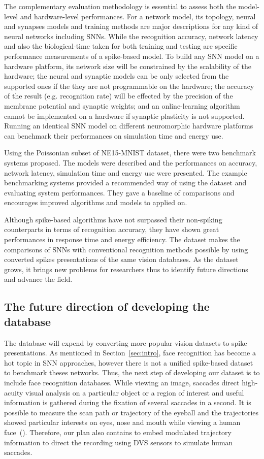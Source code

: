 The complementary evaluation methodology is essential to assess both the model-level and hardware-level performances.
For a network model, its topology, neural and synapses models and training methods are major descriptions for any kind of neural networks including SNNs.
While the recognition accuracy, network latency and also the biological-time taken for both training and testing are specific performance measurements of a spike-based model.
To build any SNN model on a hardware platform, its network size will be constrained by the scalability of the hardware;
the neural and synaptic models can be only selected from the supported ones if the they are not programmable on the hardware;
the accuracy of the result (e.g. recognition rate) will be effected by the precision of the membrane potential and synaptic weights;
and an online-learning algorithm cannot be implemented on a hardware if synaptic plasticity is not supported.
Running an identical SNN model on  different neuromorphic hardware platforms can benchmark their performances on simulation time and energy use.


Using the Poissonian subset of NE15-MNIST dataset, there were two benchmark systems proposed. 
The models were described and the performances on accuracy, network latency, simulation time and energy use were presented.
The example benchmarking systems provided a recommended way of using the dataset and evaluating system performances.
They gave a baseline of comparisons and encourages improved algorithms and models to applied on. 

Although spike-based algorithms have not surpassed their non-spiking counterparts in terms of recognition accuracy, they have shown great performances in response time and energy efficiency.
The dataset makes the comparisons of SNNs with conventional recognition methods possible by using converted spikes presentations of the same vision databases.
As the dataset grows, it brings new problems for researchers thus to identify future directions and advance the field.
\subsection{The future direction of developing the database}
The database will expend by converting more popular vision datasets to spike presentations.
As mentioned in Section~\ref{sec:intro}, face recognition has become a hot topic in SNN approaches, however there is not a unified spike-based dataset to benchmark theses networks.
Thus, the next step of developing our dataset is to include face recognition databases.
While viewing an image,  saccades direct high-acuity visual analysis on a particular object or a region of interest and useful information is gathered during the fixation of several saccades in a second.
It is possible to measure the scan path or trajectory of the eyeball and the trajectories showed particular interests on eyes, nose and mouth while viewing a human face~(\cite{yarbus1967eye}).
Therefore, our plan also contains to embed modulated trajectory information to direct the recording using DVS sensors to simulate human saccades.


